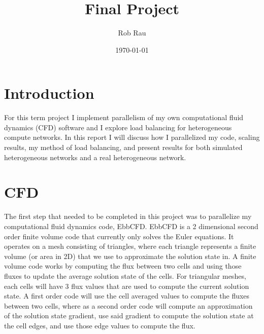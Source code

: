 \documentclass[12pt,parskip=full]{article}
\numberwithin{subsection}{section}
\begin{document}
	\vspace{-4ex}
	\title{Final Project\vspace{-3.5ex}}
	\author{Rob Rau\vspace{-4ex}}
	\date{\today\vspace{-4ex}}
	\maketitle

	\section{Introduction}
		For this term project I implement parallelism of my own computational fluid dynamics (CFD) software and I explore load balancing
		for heterogeneous compute networks. In this report I will discuss how I parallelized my code, scaling results, my method of
		load balancing, and present results for both simulated heterogeneous networks and a real heterogeneous network. 

	\section{CFD}
		The first step that needed to be completed in this project was to parallelize my computational fluid dynamics code, EbbCFD.
		EbbCFD is a 2 dimensional second order finite volume code that currently only solves the Euler equations. It operates on a
		mesh consisting of triangles, where each triangle represents a finite volume (or area in 2D) that we use to approximate the
		solution state in. A finite volume code works by computing the flux between two cells and using those fluxes to update the
		average solution state of the cells. For triangular meshes, each cells will have 3 flux values that are used to compute the
		current solution state. A first order code will use the cell averaged values to compute the fluxes between two cells, where
		as a second order code will compute an approximation of the solution state gradient, use said gradient to compute the solution
		state at the cell edges, and use those edge values to compute the flux.
		
\end{document}
